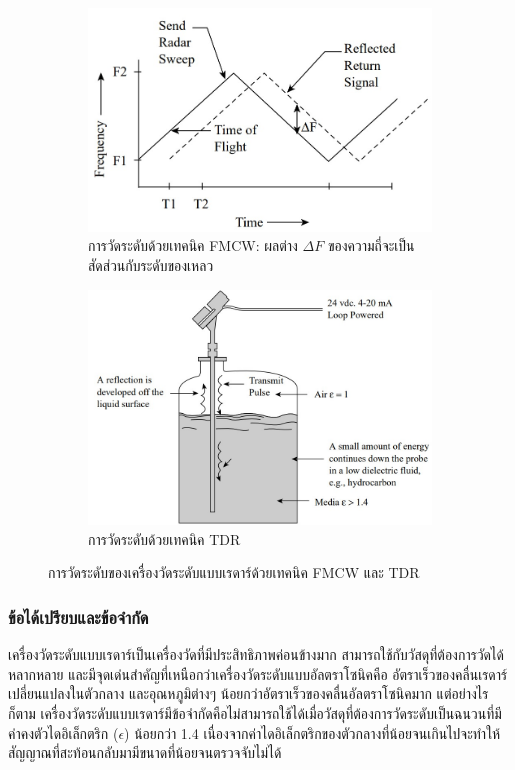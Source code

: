 \documentclass[final,11pt,a4paper]{article}
\begin{document}
\begin{figure}
    \begin{subfigure}[b]{0.4\textwidth}
        \centering
        \includegraphics[width=\textwidth]{images/Screenshot_19.jpg}
        \caption{การวัดระดับด้วยเทคนิค FMCW: ผลต่าง $\Delta F$ ของความถี่จะเป็นสัดส่วนกับระดับของเหลว}
        \label{fig:rtl1}
    \end{subfigure}
    \hfill
    \begin{subfigure}[b]{0.6\textwidth}
        \centering
        \includegraphics[width=\textwidth]{images/Screenshot_18.jpg}
        \caption{การวัดระดับด้วยเทคนิค TDR}
        \label{fig:rtl2}
    \end{subfigure}
    \hfill
    \caption{การวัดระดับของเครื่องวัดระดับแบบเรดาร์ด้วยเทคนิค FMCW และ TDR}
    \label{fig:rtl}
\end{figure}

\subsubsection{ข้อได้เปรียบและข้อจำกัด}
เครื่องวัดระดับแบบเรดาร์เป็นเครื่องวัดที่มีประสิทธิภาพค่อนข้างมาก สามารถใช้กับวัสดุที่ต้องการวัดได้หลากหลาย และมีจุดเด่นสำคัญที่เหนือกว่าเครื่องวัดระดับแบบอัลตราโซนิคคือ
อัตราเร็วของคลื่นเรดาร์เปลี่ยนแปลงในตัวกลาง และอุณหภูมิต่างๆ น้อยกว่าอัตราเร็วของคลื่นอัลตราโซนิคมาก แต่อย่างไรก็ตาม 
เครื่องวัดระดับแบบเรดาร์มีข้อจำกัดคือไม่สามารถใช้ได้เมื่อวัสดุที่ต้องการวัดระดับเป็นฉนวนที่มีค่าคงตัวไดอิเล็กตริก ($\epsilon$) น้อยกว่า 1.4 
เนื่องจากค่าไดอิเล็กตริกของตัวกลางที่น้อยจนเกินไปจะทำให้สัญญาณที่สะท้อนกลับมามีขนาดที่น้อยจนตรวจจับไม่ได้
\end{document}
